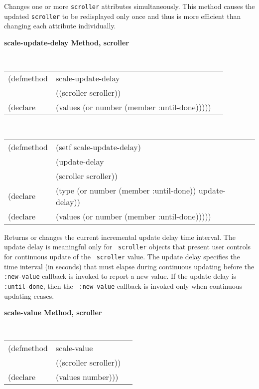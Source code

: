 \begin{flushright} \parbox[t]{6.125in}{
Changes one or more {\tt scroller} attributes simultaneously. This method causes
the updated {\tt scroller} to be redisplayed only once and thus is more efficient
than changing each attribute individually.} \end{flushright}


{\samepage  
{\large {\bf scale-update-delay \hfill Method, scroller}}
\begin{flushright} \parbox[t]{6.125in}{
\tt
\begin{tabular}{lll}
\raggedright
(defmethod & scale-update-delay & \\
& ((scroller  scroller)) \\
(declare & (values (or number (member :until-done)))))
\end{tabular}
\rm

}\end{flushright}}

\begin{flushright} \parbox[t]{6.125in}{
\tt
\begin{tabular}{lll}
\raggedright
(defmethod & (setf scale-update-delay) & \\
         & (update-delay \\
         & (scroller  scroller)) \\
(declare &(type (or number (member :until-done))  update-delay))\\
(declare & (values (or number (member :until-done)))))
\end{tabular}
\rm}
\end{flushright}

\begin{flushright} \parbox[t]{6.125in}{ Returns or changes the current
incremental update delay time interval.  The update delay is meaningful only for
{\tt
scroller} objects that present user controls for continuous update of the {\tt
scroller} value. The update delay specifies the time interval (in seconds) that
must elapse during continuous updating before the {\tt :new-value} callback is
invoked to report a new value. If the update delay is {\tt :until-done}, then the {\tt
:new-value} callback is invoked only when continuous updating ceases.}
\end{flushright}

{\samepage  
{\large {\bf scale-value \hfill Method, scroller}}
\begin{flushright} \parbox[t]{6.125in}{
\tt
\begin{tabular}{lll}
\raggedright
(defmethod & scale-value & \\
& ((scroller  scroller)) \\
(declare & (values number)))
\end{tabular}
\rm

}\end{flushright}}

